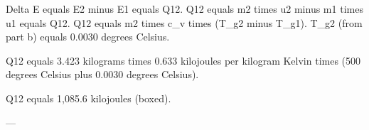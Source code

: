 Delta E equals E2 minus E1 equals Q12.  
Q12 equals m2 times u2 minus m1 times u1 equals Q12.  
Q12 equals m2 times c_v times (T_g2 minus T_g1).  
T_g2 (from part b) equals 0.0030 degrees Celsius.  

Q12 equals 3.423 kilograms times 0.633 kilojoules per kilogram Kelvin times (500 degrees Celsius plus 0.0030 degrees Celsius).  

Q12 equals 1,085.6 kilojoules (boxed).  

---